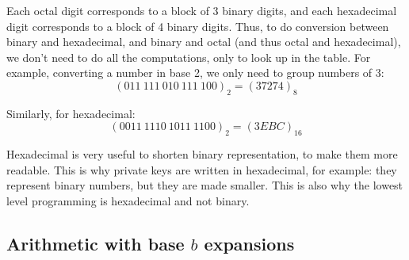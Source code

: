 \documentclass[a4paper]{article}
\begin{document}
{    

    Each octal digit corresponds to a block of 3 binary digits, and each hexadecimal digit corresponds to a block of 4 binary digits. Thus, to do conversion between binary and hexadecimal, and binary and octal (and thus octal and hexadecimal), we don't need to do all the computations, only to look up in the table. For example, converting a number in base 2, we only need to group numbers of 3:
    \[\left(011\ 111\ 010\ 111\ 100\right)_2 = \left(37274\right)_8\]

    Similarly, for hexadecimal:  
    \[\left(0011\ 1110\ 1011\ 1100\right)_2 = \left(3EBC\right)_{16}\]
    

    Hexadecimal is very useful to shorten binary representation, to make them more readable. This is why private keys are written in hexadecimal, for example: they represent binary numbers, but they are made smaller. This is also why the lowest level programming is hexadecimal and not binary.
}

\subsection{Arithmetic with base $b$ expansions}
\end{document}
